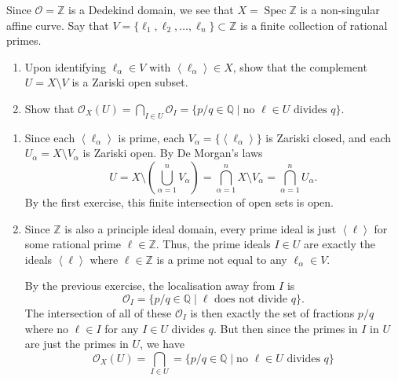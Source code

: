 \documentclass[12 pt, letterpaper]{hmcpset}
\begin{document}
\pagebreak

\begin{problem}[Problem 3.]
	Since $\mathcal{O} = \mathbb{Z}$ is a Dedekind domain, we see that $X = \operatorname{Spec} \mathbb{Z}$ is a non-singular affine curve. Say that $V = \{ \ell_{1}, \ell_{2}, \dots, \ell_{n} \} \subset \mathbb{Z}$ is a finite collection of rational primes.
	\begin{enumerate}
		\item Upon identifying $\ell_{\alpha} \in V$ with $\left < \ell_{\alpha} \right > \in X$, show that the complement $U = X \setminus V$ is a Zariski open subset.
		\item Show that $\mathcal{O}_{X}(U) = \bigcap_{I \in U} \mathcal{O}_{I} = \{ p / q \in \mathbb{Q} \mid \text{no } \ell \in U \text{ divides } q \}$.	
	\end{enumerate}
\end{problem}

\begin{solution}
	\begin{enumerate}
		\item Since each $\left < \ell_{\alpha} \right >$ is prime, each $V_{\alpha} = \{ \left < \ell_{\alpha} \right > \}$ is Zariski closed, and each $U_{\alpha} = X \setminus V_{\alpha}$ is Zariski open. By De Morgan's laws
			\[
				U = X \setminus \left ( \bigcup_{\alpha = 1}^{n} V_{\alpha} \right ) = \bigcap_{\alpha = 1}^{n} X \setminus V_{\alpha} = \bigcap_{\alpha = 1}^{n} U_{\alpha}.
			\]
			By the first exercise, this finite intersection of open sets is open.
		\item Since $\mathbb{Z}$ is also a principle ideal domain, every prime ideal is just $\left < \ell \right >$ for some rational prime $\ell \in \mathbb{Z}$. Thus, the prime ideals $I \in U$ are exactly the ideals $\left < \ell \right >$ where $\ell \in \mathbb{Z}$ is a prime not equal to any $\ell_{\alpha} \in V$. 

			By the previous exercise, the localisation away from $I$ is
			\[
				\mathcal{O}_{I} = \{ p / q \in \mathbb{Q} \mid \ell \text{ does not divide } q \}.
			\]
			The intersection of all of these $\mathcal{O}_{I}$ is then exactly the set of fractions $p / q$ where no  $\ell \in I$ for any $I \in U$ divides $q$. But then since the primes in $I$ in $U$ are just the primes in $U$, we have
			\[
				\mathcal{O}_{X}(U) = \bigcap_{I \in U} = \{ p / q \in \mathbb{Q} \mid \text{no } \ell \in U \text{ divides } q \}
			\]
	\end{enumerate}
\end{solution}
\end{document}

